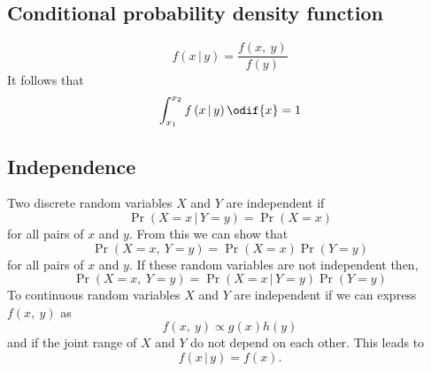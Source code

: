 \documentclass{article}
\begin{document}
\begin{multicols}{3}
    \subsection{Conditional probability density function}
    \begin{equation*}
        f\left( x \,\vert\, y \right) = \frac{f\left( x,\: y \right)}{f\left( y \right)}
    \end{equation*}
    It follows that
    \begin{equation*}
        \int_{x_1}^{x_2} f\left( x \,\vert\, y \right) \odif{x} = 1
    \end{equation*}
    \subsection{Independence}
    Two discrete random variables \(X\) and \(Y\) are independent if
    \begin{equation*}
        \Pr{\left( X = x \,\vert\, Y = y \right)} = \Pr{\left( X = x \right)}
    \end{equation*}
    for all pairs of \(x\) and \(y\). From this we can show that
    \begin{equation*}
        \Pr{\left( X = x ,\: Y = y \right)} = \Pr{\left( X = x \right)} \Pr{\left( Y = y \right)}
    \end{equation*}
    for all pairs of \(x\) and \(y\). If these random variables are not independent then,
    \begin{equation*}
        \Pr{\left( X = x ,\: Y = y \right)} = \Pr{\left( X = x \,\vert\, Y = y \right)} \Pr{\left( Y = y \right)}
    \end{equation*}
    To continuous random variables \(X\) and \(Y\) are independent if we can express \(f\left( x,\: y \right)\) as
    \begin{equation*}
        f\left( x,\: y \right) \propto g\left( x \right) h\left( y \right)
    \end{equation*}
    and if the joint range of \(X\) and \(Y\) do not depend on each other. This leads to
    \begin{equation*}
        f\left( x \,\vert\, y \right) = f\left( x \right).
    \end{equation*}

\end{multicols}
\end{document}
